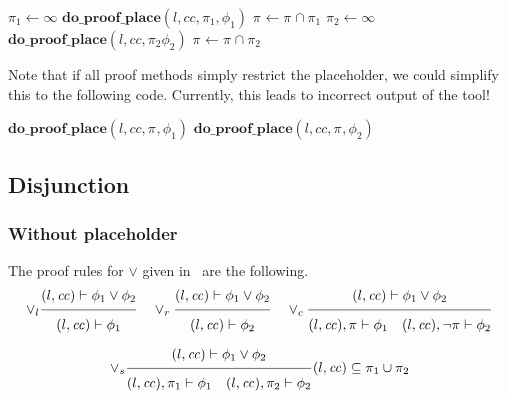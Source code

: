 \documentclass{article}
\newcommand{\proofrule}[3][]{#1 \frac{\raisebox{.7ex}{\normalsize{$#2$}}}
  {\raisebox{-1.0ex}{\normalsize{$#3$}}}}
\newcommand{\placeholder}[1][]{\pi_{#1}}
\newcommand{\loc}{l}
\newcommand{\region}{\mathit{cc}}
\newcommand{\method}[1]{\ensuremath{\mathbf{#1}}}
\begin{document}
\begin{algorithm}[H]
\caption{$\method{do\_proof\_place\_and}(\loc, \region, \placeholder, \phi_1 \land \phi_2)$}
\begin{algorithmic}
\STATE $\placeholder[1] \gets \infty$
\STATE $\method{do\_proof\_place}(\loc, \region, \placeholder[1], \phi_1)$
\STATE $\placeholder \gets \placeholder \cap \placeholder[1]$
\IF{$\placeholder = \emptyset$}
  \STATE $\placeholder[2] \gets \infty$
  \STATE $\method{do\_proof\_place}(\loc, \region, \placeholder[2] \phi_2)$
  \STATE $\placeholder \gets \placeholder \cap \placeholder[2]$
\ENDIF
\end{algorithmic}
\end{algorithm}
Note that if all proof methods simply restrict the placeholder, we could simplify this to the following code.
Currently, this leads to incorrect output of the tool!
\begin{algorithm}[H]
\caption{$\method{do\_proof\_place\_and}(\loc, \region, \placeholder, \phi_1 \land \phi_2)$}
\begin{algorithmic}
\STATE $\method{do\_proof\_place}(\loc, \region, \placeholder, \phi_1)$
\IF{$\placeholder = \emptyset$}
  \STATE $\method{do\_proof\_place}(\loc, \region, \placeholder, \phi_2)$
\ENDIF
\end{algorithmic}
\end{algorithm}

\subsection{Disjunction}

\subsubsection{Without placeholder}

The proof rules for $\lor$ given in~\cite{FC:14} are the following.
\[
\proofrule[\lor_l]
{(\loc, \region) \vdash \phi_1 \lor \phi_2}
{(\loc, \region) \vdash \phi_1}
%
\quad
\proofrule[\lor_r]
{(\loc, \region) \vdash \phi_1 \lor \phi_2}
{(\loc, \region) \vdash \phi_2}
\quad
\proofrule[\lor_c]
{(\loc, \region) \vdash \phi_1 \lor \phi_2}
{(\loc, \region), \placeholder \vdash \phi_1
\quad
(\loc, \region), \lnot \placeholder \vdash \phi_2
}
\]

\[
\proofrule[\lor_s]
{(\loc, \region) \vdash \phi_1 \lor \phi_2}
{(\loc, \region), \placeholder[1] \vdash \phi_1
\quad (\loc, \region), \placeholder[2] \vdash \phi_2}
(\loc, \region) \subseteq \placeholder[1] \cup \placeholder[2]
\]
\end{document}
